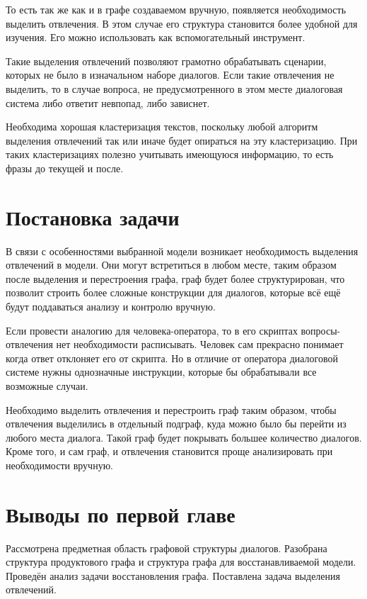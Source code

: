 \documentclass[specification,annotation]{itmo-student-thesis}
\begin{document}
	То есть так же как и в графе создаваемом вручную, появляется необходимость выделить отвлечения. В этом случае его структура становится более удобной для изучения. Его можно использовать как вспомогательный инструмент. 
	
	Такие выделения отвлечений позволяют грамотно обрабатывать сценарии, которых не было в изначальном наборе диалогов. Если такие отвлечения не выделить, то в случае вопроса, не предусмотренного в этом месте диалоговая система либо ответит невпопад, либо зависнет.
	
	Необходима хорошая кластеризация текстов, поскольку любой алгоритм выделения отвлечений так или иначе будет опираться на эту кластеризацию. При таких кластеризациях полезно учитывать имеющуюся информацию, то есть фразы до текущей и после.
	
	
	\section{Постановка задачи}
	В связи с особенностями выбранной модели возникает необходимость выделения отвлечений в модели. Они могут встретиться в любом месте, таким образом после выделения и перестроения графа, граф будет более структурирован, что позволит строить более сложные конструкции для диалогов, которые всё ещё будут поддаваться анализу и контролю вручную.
	
	Если провести аналогию для человека-оператора, то в его скриптах вопросы-отвлечения нет необходимости расписывать. Человек сам прекрасно понимает когда ответ отклоняет его от скрипта. Но в отличие от оператора диалоговой системе нужны однозначные инструкции, которые бы обрабатывали все возможные случаи.
	
	Необходимо выделить отвлечения и перестроить граф таким образом, чтобы отвлечения выделились в отдельный подграф, куда можно было бы перейти из любого места диалога. Такой граф будет покрывать большее количество диалогов. Кроме того, и сам граф, и отвлечения становится проще анализировать при необходимости вручную.
	
	\section{Выводы по первой главе}
	Рассмотрена предметная область графовой структуры диалогов. Разобрана структура продуктового графа и структура графа для восстанавливаемой модели. Проведён анализ задачи восстановления графа. Поставлена задача выделения отвлечений. 
	
\end{document}
